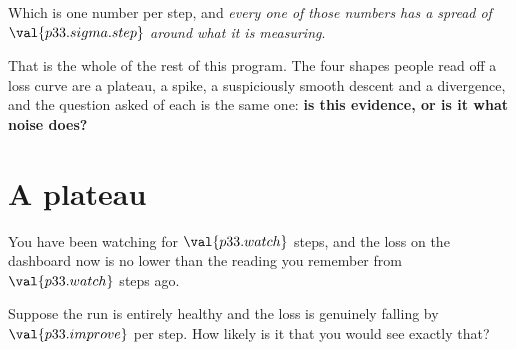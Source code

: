 \begin{fr}
Which is one number per step, and \emph{every one of those numbers has a
spread of $\val{p33.sigma.step}$ around what it is measuring}.

That is the whole of the rest of this program. The four shapes people read
off a loss curve are a plateau, a spike, a suspiciously smooth descent and a
divergence, and the question asked of each is the same one:
\textbf{is this evidence, or is it what noise does?}
\end{fr}

\section{A plateau}
\label{sec:P33-plateau}


\begin{fr}
You have been watching for $\val{p33.watch}$ steps, and the loss on the
dashboard now is no lower than the reading you remember from
$\val{p33.watch}$ steps ago.

Suppose the run is entirely healthy and the loss is genuinely falling by
$\val{p33.improve}$ per step. How likely is it that you would see exactly
that?
\dotline
\nextframe
\end{fr}

